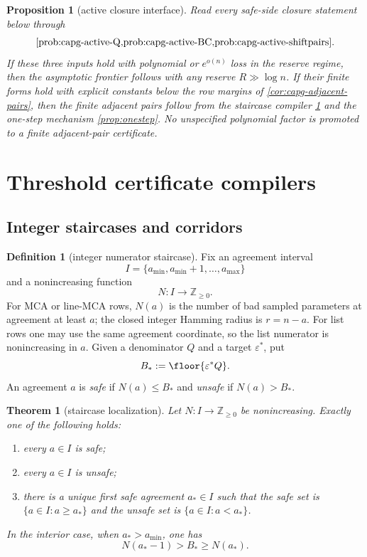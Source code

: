 \documentclass[11pt]{article}
\newtheorem{theorem}{Theorem}[section]
\newtheorem{proposition}[proposition]{Proposition}
\theoremstyle{definition}
\newtheorem{definition}[definition]{Definition}
\theoremstyle{remark}
\begin{document}
\begin{proposition}[active closure interface]
\label{prop:capg-active-interface}
Read every safe-side closure statement below through
\[
        \cref{prob:capg-active-Q,prob:capg-active-BC,prob:capg-active-shiftpairs}.
\]
If these three inputs hold with polynomial or \(e^{o(n)}\) loss in the reserve
regime, then the asymptotic frontier follows with any reserve
\(R\gg\log n\).  If their finite forms hold with explicit constants below the
row margins of \cref{cor:capg-adjacent-pairs}, then the finite adjacent pairs
follow from the staircase compiler \cref{thm:capf-staircase} and the one-step
mechanism \cref{prop:onestep}.  No unspecified polynomial factor is promoted to
a finite adjacent-pair certificate.
\end{proposition}

\section{Threshold certificate compilers}\label{sec:capf-threshold}

\subsection{Integer staircases and corridors}

\begin{definition}[integer numerator staircase]\label{def:capf-staircase}
Fix an agreement interval
\[
        I=\{a_{\min},a_{\min}+1,\ldots,a_{\max}\}
\]
and a nonincreasing function
\[
        N:I\longrightarrow \mathbb Z_{\ge0}.
\]
For MCA or line-MCA rows, $N(a)$ is the number of bad sampled parameters at agreement at least $a$; the closed integer Hamming radius is $r=n-a$.  For list rows one may use the same agreement coordinate, so the list numerator is nonincreasing in $a$.  Given a denominator $Q$ and a target $\varepsilon^*$, put
\[
        B_*:=\floor{\varepsilon^* Q}.
\]
An agreement $a$ is \emph{safe} if $N(a)\le B_*$ and \emph{unsafe} if $N(a)>B_*$.
\end{definition}

\begin{theorem}[staircase localization]\label{thm:capf-staircase}
Let $N:I\to\mathbb Z_{\ge0}$ be nonincreasing.  Exactly one of the following holds:
\begin{enumerate}[label=\textup{(\roman*)}]
\item every $a\in I$ is safe;
\item every $a\in I$ is unsafe;
\item there is a unique first safe agreement $a_*\in I$ such that the safe set is $\{a\in I:a\ge a_*\}$ and the unsafe set is $\{a\in I:a<a_*\}$.
\end{enumerate}
In the interior case, when $a_*>a_{\min}$, one has
\[
        N(a_*-1)>B_*\ge N(a_*).
\]
\end{theorem}
\end{document}
